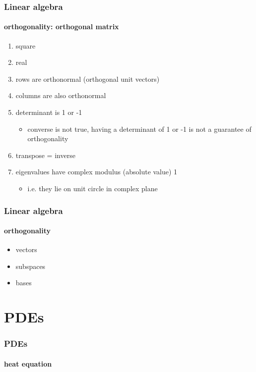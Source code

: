\begin{frame}
\frametitle{Linear algebra}
\framesubtitle{orthogonality: orthogonal matrix}
\logoCSIPCPL\mypagenum\mypagenum
	\begin{enumerate}		
		\item square
		\item real	
		\item rows are orthonormal (orthogonal unit vectors)
		\item columns are also orthonormal
		\item determinant is 1 or -1
			\begin{itemize}
				\item converse is not true, having a determinant of 1 or -1 is not a guarantee of orthogonality
			\end{itemize}
		\item transpose = inverse
		\item eigenvalues have complex modulus (absolute value) 1
			\begin{itemize}
				\item i.e. they lie on unit circle in complex plane
			\end{itemize}
	\end{enumerate}
\end{frame}





\begin{frame}
\frametitle{Linear algebra}
\framesubtitle{orthogonality}
\logoCSIPCPL\mypagenum\mypagenum
	\begin{itemize}				
		\item vectors
		\item subspaces
		\item bases
	\end{itemize}
\end{frame}



\section{PDEs}
\begin{frame}
\frametitle{PDEs}
\framesubtitle{heat equation}
\logoCSIPCPL\mypagenum
\end{frame}

